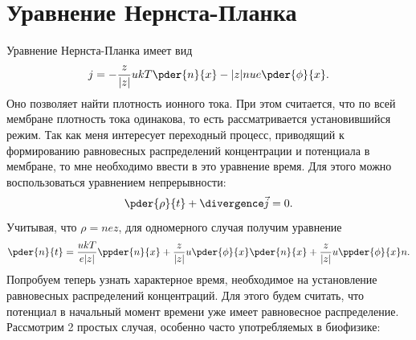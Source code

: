 \documentclass{hedwork}
\begin{document}
\tableofcontents
\section{Уравнение Нернста-Планка}
    Уравнение Нернста-Планка имеет вид
    \begin{equation}
        j = -\frac{z}{|z|}ukT\pder{n}{x} - |z|nue\pder{\phi}{x}.
        \label{eq:nernst-plank}
    \end{equation}
    Оно позволяет найти плотность ионного тока. При этом считается, что по всей
    мембране плотность тока одинакова, то есть рассматривается установившийся
    режим. Так как меня интересует переходный процесс, приводящий к формированию
    равновесных распределений концентрации и потенциала в мембране, то мне
    необходимо ввести в это уравнение время. Для этого можно воспользоваться
    уравнением непрерывности:
    \begin{equation}
        \pder{\rho}{t} + \divergence\vec{j} = 0.
    \end{equation}
    Учитывая, что \( \rho = nez \), для одномерного случая получим уравнение
    \begin{equation}
        \pder{n}{t} = \frac{ukT}{e|z|}\ppder{n}{x} +
            \frac{z}{|z|}u\pder{\phi}{x}\pder{n}{x} +
            \frac{z}{|z|}u\ppder{\phi}{x}n.
        \label{eq:nernst-plank_with_time}
    \end{equation}
    Попробуем теперь узнать характерное время, необходимое на установление
    равновесных распределений концентраций. Для этого будем считать, что
    потенциал в начальный момент времени уже имеет равновесное
    распределение. Рассмотрим 2 простых случая, особенно часто употребляемых в
    биофизике:
\end{document}

